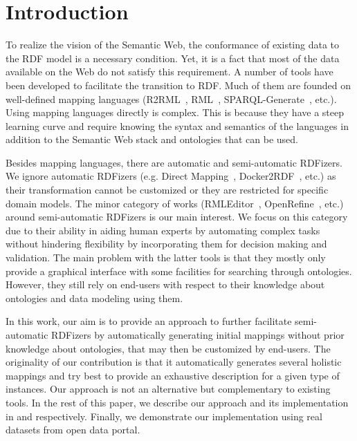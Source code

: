 \section{Introduction}

To realize the vision of the Semantic Web, the conformance of existing data to the RDF model is a necessary condition. Yet, it is a fact that most of the data available on the Web do not satisfy this requirement. A number of tools have been developed to facilitate the transition to RDF. Much of them are founded on well-defined mapping languages (R2RML~\cite{R2RML_W3C:12}, RML~\cite{dimou2014rml}, SPARQL-Generate~\cite{lefranccois2016flexible}, etc.). Using mapping languages directly is complex. This is because they have a steep learning curve and require knowing the syntax and semantics of the languages in addition to the Semantic Web stack and ontologies that can be used. 

Besides mapping languages, there are automatic and semi-automatic RDFizers. We ignore automatic RDFizers (e.g. Direct Mapping~\cite{Direct_Mapping_W3C:12}, Docker2RDF~\cite{ayed2017docker2rdf}, etc.) as their transformation cannot be customized or they are restricted for specific domain models. The minor category of works (RMLEditor~\cite{heyvaert2016rmleditor}, OpenRefine~\cite{verborgh2013using}, etc.) around semi-automatic RDFizers is our main interest. We focus on this category due to their ability in aiding human experts by automating complex tasks without hindering flexibility by incorporating them for decision making and validation. The main problem with the latter tools is that they mostly only provide a graphical interface with some facilities for searching through ontologies. However, they still rely on end-users with respect to their knowledge about ontologies and data modeling using them.

In this work, our aim is to provide an approach to further facilitate semi-automatic RDFizers by automatically generating initial mappings without prior knowledge about ontologies, that may then be customized by end-users. The originality of our contribution is that it automatically generates several holistic mappings and try best to provide an exhaustive description for a given type of instances. Our approach is not an alternative but complementary to existing tools. In the rest of this paper, we describe our approach and its implementation in  and  respectively. Finally, we demonstrate our implementation using real datasets from open data portal. %



